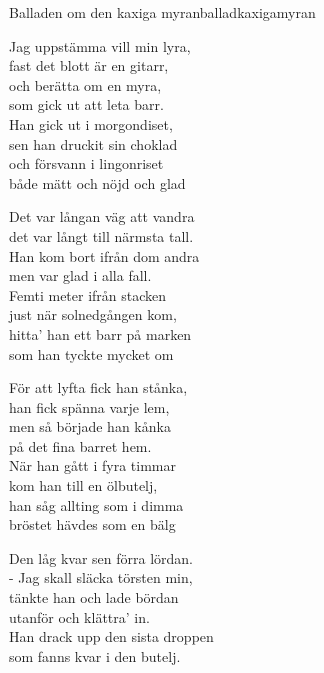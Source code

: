 \begin{song}{Balladen om den kaxiga myran}{balladkaxigamyran}
\begin{vers}
Jag uppstämma vill min lyra,\\
fast det blott är en gitarr,\\
och berätta om en myra,\\
som gick ut att leta barr.\\
Han gick ut i morgondiset,\\
sen han druckit sin choklad\\
och försvann i lingonriset\\
\repopen både mätt och nöjd och glad \repclose\\
\end{vers}
\begin{vers}
Det var långan väg att vandra\\
det var långt till närmsta tall.\\
Han kom bort ifrån dom andra\\
men var glad i alla fall.\\
Femti meter ifrån stacken\\
just när solnedgången kom,\\
hitta' han ett barr på marken\\
\repopen som han tyckte mycket om \repclose\\
\end{vers}
\begin{vers}
För att lyfta fick han stånka,\\
han fick spänna varje lem,\\
men så började han kånka\\
på det fina barret hem.\\
När han gått i fyra timmar\\
kom han till en ölbutelj,\\
han såg allting som i dimma\\
\repopen bröstet hävdes som en bälg \repclose\\
\end{vers}
\begin{vers}
Den låg kvar sen förra lördan.\\
- Jag skall släcka törsten min,\\
tänkte han och lade bördan\\
utanför och klättra' in.\\
Han drack upp den sista droppen\\
som fanns kvar i den butelj.\\

\end{vers}
\end{song}
